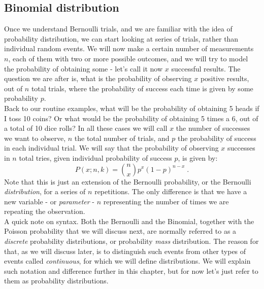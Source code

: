 \documentclass{book}
\begin{document}
\subsection{Binomial distribution}

Once we understand Bernoulli trials, and we are familiar with the idea of probability distribution, we can start looking at series of trials, rather than individual random events. We will now make a certain number of measurements $n$, each of them with two or more possible outcomes, and we will try to model the probability of obtaining some - let's call it now $x$ successful results. The question we are after is, what is the probability of observing $x$ positive results, out of $n$ total trials, where the probability of success each time is given by some probability $p$.\\

Back to our routine examples, what will be the probability of obtaining 5 heads if I toss 10 coins? Or what would be the probability of obtaining 5 times a 6, out of a total of 10 dice rolls? In all these cases we will call $x$ the number of successes we want to observe, $n$ the total number of trials, and $p$ the probability of success in each individual trial. We will say that the probability of observing $x$ successes in $n$ total tries, given individual probability of success $p$, is given by:
\begin{equation}
    P(x; n, k) = \binom{n}{x} p^x (1-p)^{n-x} \; .
    \label{eq:binomial}
\end{equation}
Note that this is just an extension of the Bernoulli probability, or the Bernoulli \textit{distribution}, for a series of $n$ repetitions. The only difference is that we have a new variable - or \textit{parameter} - $n$ representing the number of times we are repeating the observation.\\

A quick note on syntax. Both the Bernoulli and the Binomial, together with the Poisson probability that we will discuss next, are normally referred to as a \textit{discrete} probability distributions, or probability \textit{mass} distribution. The reason for that, as we will discuss later, is to distinguish such events from other types of events called \textit{continuous}, for which we will define  distributions. We will explain such notation and difference further in this chapter, but for now let's just refer to them as probability distributions.\\
\end{document}
